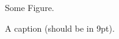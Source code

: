 \documentclass{ltugboat}
\begin{document}
\begin{figure}
Some Figure.
\caption{A caption (should be in 9pt).}
\end{figure}
\end{document}
